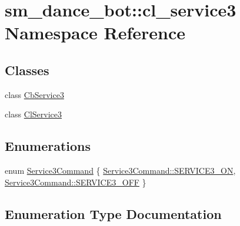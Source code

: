 \hypertarget{namespacesm__dance__bot_1_1cl__service3}{}\section{sm\+\_\+dance\+\_\+bot\+:\+:cl\+\_\+service3 Namespace Reference}
\label{namespacesm__dance__bot_1_1cl__service3}
\subsection*{Classes}
\begin{DoxyCompactItemize}
\item 
class \hyperlink{classsm__dance__bot_1_1cl__service3_1_1CbService3}{Cb\+Service3}
\item 
class \hyperlink{classsm__dance__bot_1_1cl__service3_1_1ClService3}{Cl\+Service3}
\end{DoxyCompactItemize}
\subsection*{Enumerations}
\begin{DoxyCompactItemize}
\item 
enum \hyperlink{namespacesm__dance__bot_1_1cl__service3_adbcecb84d61edff09f1fb67ef9607ac4}{Service3\+Command} \{ \hyperlink{namespacesm__dance__bot_1_1cl__service3_adbcecb84d61edff09f1fb67ef9607ac4a13cdca48a01bbb44fa8fb35567fbc58e}{Service3\+Command\+::\+S\+E\+R\+V\+I\+C\+E3\+\_\+\+ON}, 
\hyperlink{namespacesm__dance__bot_1_1cl__service3_adbcecb84d61edff09f1fb67ef9607ac4a642ed22a7f6b816840289b4256116e9e}{Service3\+Command\+::\+S\+E\+R\+V\+I\+C\+E3\+\_\+\+O\+FF}
 \}
\end{DoxyCompactItemize}


\subsection{Enumeration Type Documentation}
